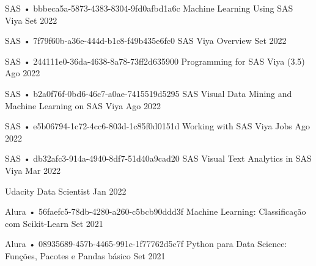 \begin{cventries}
  \cventry
    {SAS • bbbeca5a-5873-4383-8304-9fd0afbd1a6c} %
    {Machine Learning Using SAS Viya} %
    {} %
    {Set 2022} %
    {}

  \cventry
    {SAS • 7f79f60b-a36e-444d-b1c8-f49b435e6fc0} %
    {SAS Viya Overview} %
    {} %
    {Set 2022} %
    {}

  \cventry
    {SAS • 244111e0-36da-4638-8a78-73ff2d635900} %
    {Programming for SAS Viya (3.5)} %
    {} %
    {Ago 2022} %
    {}

  \cventry
    {SAS • b2a0f76f-0bd6-46c7-a0ae-7415519d5295} %
    {SAS Visual Data Mining and Machine Learning on SAS Viya} %
    {} %
    {Ago 2022} %
    {}

  \cventry
    {SAS • e5b06794-1c72-4cc6-803d-1c85f0d0151d} %
    {Working with SAS Viya Jobs} %
    {} %
    {Ago 2022} %
    {}

  \cventry
    {SAS • db32afc3-914a-4940-8df7-51d40a9cad20} %
    {SAS Visual Text Analytics in SAS Viya} %
    {} %
    {Mar 2022} %
    {}

  \cventry
    {Udacity} %
    {Data Scientist} %
    {} %
    {Jan 2022} %
    {}

  \cventry
    {Alura • 56faefc5-78db-4280-a260-c5bcb90ddd3f} %
    {Machine Learning: Classificação com Scikit-Learn} %
    {} %
    {Set 2021} %
    {}

  \cventry
    {Alura • 08935689-457b-4465-991c-1f77762d5c7f} %
    {Python para Data Science: Funções, Pacotes e Pandas básico} %
    {} %
    {Set 2021} %
    {}


\end{cventries}
